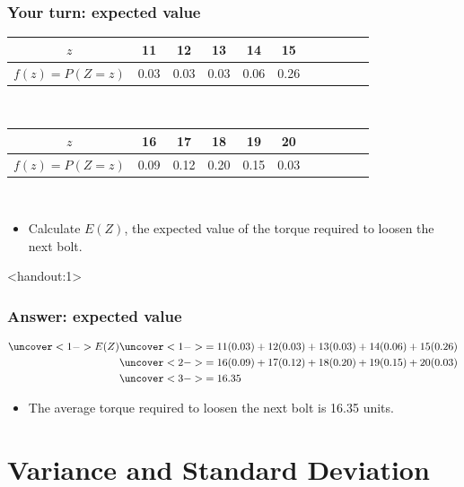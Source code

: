 \documentclass[handout]{beamer}\usepackage[]{graphicx}\usepackage[]{color}
\newcommand{\answers}{1}
\providecommand{\q}{$\quad$ \newline}
\numberwithin{equation}{section}
\begin{document}
\begin{frame}
\frametitle{Your turn: expected value}

\begin{center}
\begin{tabular}{ccccccccccc}
$z$ & 11 & 12 & 13 & 14 & 15 \\ \hline
$f(z) = P(Z = z)$ & 0.03 & 0.03 & 0.03 & 0.06 & 0.26 
\end{tabular} \q

\begin{tabular}{ccccccccccc}
$z$ & 16 & 17 & 18 & 19 & 20 \\ \hline
$f(z) = P(Z = z)$ &  0.09 & 0.12 & 0.20 & 0.15 & 0.03 
\end{tabular} \q 
\end{center}

\begin{itemize}
\item Calculate $E(Z)$, the expected value of the torque required to loosen the next bolt.
\end{itemize}
\end{frame}

\begin{frame}<handout:\answers>
\frametitle{Answer: expected value}\scriptsize
\begin{align*}
\uncover<1->{E(Z)} & \uncover<1->{= 11 (0.03) + 12(0.03) + 13(0.03) + 14(0.06) + 15(0.26)} \\
& \uncover<2->{= 16(0.09) + 17(0.12) + 18(0.20) + 19(0.15) + 20(0.03)} \\
& \uncover<3->{= 16.35}
\end{align*}

\begin{itemize}
\pause \pause \pause \item The average torque required to loosen the next bolt is 16.35 units.
\end{itemize}
\end{frame}






\section{Variance and Standard Deviation}
\end{document}
